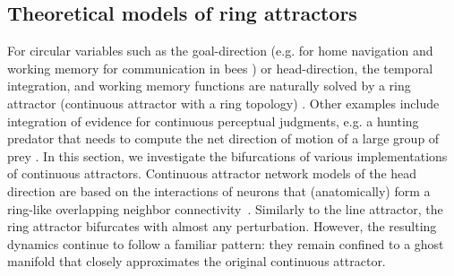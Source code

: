 \documentclass{article} %
\newcounter{ct}
\theoremstyle{definition}
\theoremstyle{remark}
\begin{document}
\subsection{Theoretical models of ring attractors}\label{sec:ras}

For circular variables such as the goal-direction (e.g. for home navigation and working memory for communication	 in bees \citep{frisch1993dance}) %
or head-direction, the temporal integration, and working memory functions are naturally solved by a ring attractor (continuous attractor with a ring topology) \citep{kim2017ring,kim2019generation,turner2017angular,turner2020neuroanatomical,hulse2020mechanisms,taube2003persistent,taube2007head,angelaki2020head,fisher2022flexible}.
Other examples include
integration of evidence for continuous perceptual judgments, e.g. a hunting predator that needs to compute the net direction of motion of a large group of prey \citep{esnaola2022flexible}.
In this section, we investigate the bifurcations of various implementations of continuous attractors.
Continuous attractor network models of the head direction are based on the interactions of neurons that (anatomically) form a ring-like overlapping neighbor connectivity~\citep{zhang1996,noorman2024accurate,ajabi2023,vafidis2022,boucheny2005continuous,knierim2012,song2005angular,xie2002double}.
Similarly to the line attractor, the ring attractor bifurcates with almost any perturbation. However, the resulting dynamics continue to follow a familiar pattern: they remain confined to a ghost manifold that closely approximates the original continuous attractor.
\end{document}
